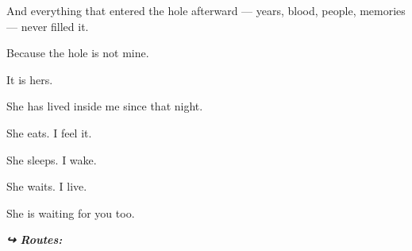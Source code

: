 \noindent And everything that entered the hole afterward --- years, blood, people, memories --- never filled it.

\noindent Because the hole is not mine.

\noindent It is hers.

\noindent She has lived inside me since that night.

\noindent She eats. I feel it.

\noindent She sleeps. I wake.

\noindent She waits. I live.

\noindent She is waiting for you too.

\vspace{0.5em}
\noindent\textit{\textbf{↪ Routes:}  \rotasep {} \rotasep {}}

